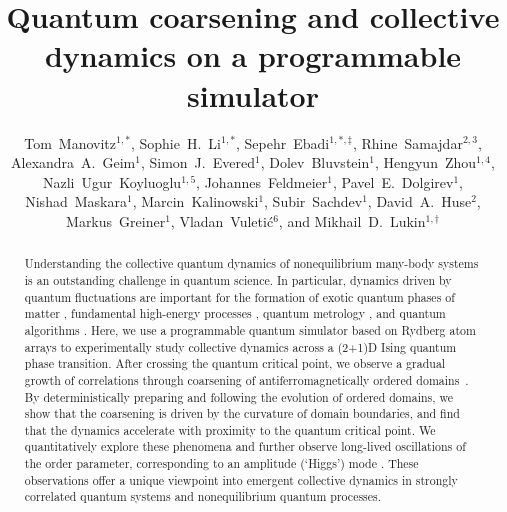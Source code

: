 \documentclass[reprint,twocolumn,secnumarabic,amssymb, aps, prx]{revtex4-2}
\begin{document}
\newcommand\numberthis{\addtocounter{equation}{1,2}\tag{\theequation}}
\title{Quantum coarsening and collective dynamics on a programmable simulator}
\author{
Tom~Manovitz$^{1,*}$, Sophie~H.~Li$^{1,*}$, Sepehr~Ebadi$^{1,*,\ddagger}$, Rhine~Samajdar$^{2,3}$, Alexandra~A.~Geim$^{1}$, Simon~J.~Evered$^{1}$, Dolev~Bluvstein$^{1}$, Hengyun~Zhou$^{1,4}$, Nazli~Ugur~Koyluoglu$^{1,5}$, Johannes~Feldmeier$^{1}$, Pavel~E.~Dolgirev$^{1}$, Nishad~Maskara$^{1}$, Marcin~Kalinowski$^{1}$, Subir~Sachdev$^{1}$, David~A.~Huse$^{2}$, Markus~Greiner$^{1}$, Vladan~Vuleti\'{c}$^{6}$, and Mikhail~D.~Lukin$^{1,\dagger}$}


\begin{abstract}

Understanding the collective quantum dynamics of nonequilibrium many-body systems is an outstanding challenge in quantum science. In particular, dynamics driven by quantum fluctuations are important for the formation of exotic quantum phases of matter \cite{altman2023quantum}, fundamental high-energy processes \cite{bauer2023highenergy}, quantum metrology \cite{degen2017sensing, li2023scrambling}, and quantum algorithms \cite{ebadi2022quantum}. Here, we use a programmable quantum simulator based on Rydberg atom arrays to experimentally study collective dynamics across a (2+1)D Ising quantum phase transition. 
After crossing the quantum critical point, we observe a gradual growth of correlations through coarsening of antiferromagnetically ordered domains~\cite{Samajdar2024}. By deterministically preparing and following the evolution of ordered domains, we show that the coarsening is driven by the curvature of domain boundaries, and find that the dynamics accelerate 
with proximity to the quantum critical point. 
We quantitatively explore these phenomena and  
further observe long-lived oscillations of the order parameter, corresponding to an amplitude (`Higgs') mode \cite{pekker2015amplitude}. These observations offer a unique viewpoint into emergent collective dynamics in strongly correlated quantum systems and nonequilibrium quantum processes.

\end{abstract}
\end{document}
